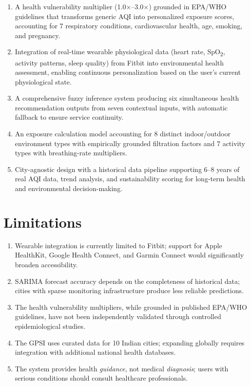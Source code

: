 \documentclass[12pt,a4paper]{report}
\begin{document}
\begin{enumerate}[leftmargin=*]
  \item A health vulnerability multiplier (1.0$\times$--3.0$\times$) grounded in EPA/WHO guidelines that transforms generic AQI into personalized exposure scores, accounting for 7 respiratory conditions, cardiovascular health, age, smoking, and pregnancy.

  \item Integration of real-time wearable physiological data (heart rate, SpO\textsubscript{2}, activity patterns, sleep quality) from Fitbit into environmental health assessment, enabling continuous personalization based on the user's current physiological state.

  \item A comprehensive fuzzy inference system producing six simultaneous health recommendation outputs from seven contextual inputs, with automatic fallback to ensure service continuity.

  \item An exposure calculation model accounting for 8 distinct indoor/outdoor environment types with empirically grounded filtration factors and 7 activity types with breathing-rate multipliers.

  \item City-agnostic design with a historical data pipeline supporting 6--8 years of real AQI data, trend analysis, and sustainability scoring for long-term health and environmental decision-making.
\end{enumerate}

\section{Limitations}

\begin{enumerate}[leftmargin=*]
  \item Wearable integration is currently limited to Fitbit; support for Apple HealthKit, Google Health Connect, and Garmin Connect would significantly broaden accessibility.
  \item SARIMA forecast accuracy depends on the completeness of historical data; cities with sparse monitoring infrastructure produce less reliable predictions.
  \item The health vulnerability multipliers, while grounded in published EPA/WHO guidelines, have not been independently validated through controlled epidemiological studies.
  \item The GPSI uses curated data for 10 Indian cities; expanding globally requires integration with additional national health databases.
  \item The system provides health \textit{guidance}, not medical \textit{diagnosis}; users with serious conditions should consult healthcare professionals.
\end{enumerate}
\end{document}

